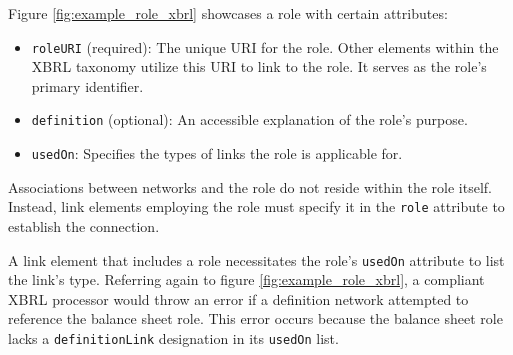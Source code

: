Figure \ref{fig:example_role_xbrl} showcases a role with certain attributes:

\begin{itemize}
    \item \texttt{roleURI} (required): The unique URI for the role. Other elements within the XBRL taxonomy utilize this URI to link to the role. It serves as the role's primary identifier.
    \item \texttt{definition} (optional): An accessible explanation of the role's purpose.
    \item \texttt{usedOn}: Specifies the types of links the role is applicable for.
\end{itemize}

Associations between networks and the role do not reside within the role itself.
Instead, link elements employing the role must specify it in the \texttt{role} attribute to establish the connection.

A link element that includes a role necessitates the role's \texttt{usedOn} attribute to list the link's type.
Referring again to figure \ref{fig:example_role_xbrl}, 
a compliant XBRL processor would throw an error if a definition network attempted to reference the balance sheet role.
This error occurs because the balance sheet role lacks a \texttt{definitionLink} designation in its \texttt{usedOn} list.

